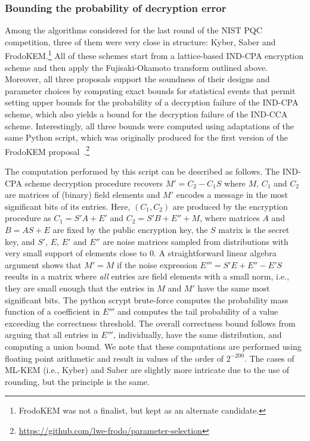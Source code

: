 \documentclass[conference,compsoc]{IEEEtran}
\begin{document}
\subsubsection*{Bounding the probability of decryption error} 
Among the algorithms considered for the last round of the NIST PQC competition, three of them were very close in structure: Kyber, Saber and FrodoKEM.\footnote{FrodoKEM was not a finalist, but kept as an alternate candidate.}
All of these schemes start from a lattice-based IND-CPA encryption scheme and then apply the Fujisaki-Okamoto transform outlined above. Moreover, all three proposals support the soundness of their designs and parameter choices by computing exact bounds for statistical events that permit setting upper bounds for the probability of a decryption failure of the IND-CPA scheme, which also yields a bound for the decryption failure of the IND-CCA scheme.
Interestingly, all three bounds were computed using adaptations of the same Python script, which was originally produced for the first version of the FrodoKEM proposal~\cite{CCS:BCDMNN16}.\footnote{\url{https://github.com/lwe-frodo/parameter-selection}}

The computation performed by this script can be described as follows.
The IND-CPA scheme decryption procedure recovers $M' = C_2 - C_1S$ where $M$, $C_1$ and $C_2$ are matrices of (binary) field elements and $M'$ encodes a message in the most significant bits of its entries. Here, $(C_1,C_2)$ are produced by the encryption procedure as $C_1 = S'A+E'$ and $C_2 = S'B+E'' + M$, where matrices $A$ and $B=AS+E$ are fixed by the public encryption key, the $S$ matrix is the secret key, and $S'$, $E$, $E'$ and $E''$ are noise matrices sampled from distributions with very small support of elements close to $0$. A straightforward linear algebra argument shows that $M'=M$ if the noise expression $E'''=S'E+E''-E'S$ results in a matrix where {\em all} entries are field elements with a small norm, i.e., they are small enough that the entries in $M$ and $M'$ have the same most significant bits.
The python scrypt brute-force computes the probability mass function of a coefficient in $E'''$ and computes the tail probability of a value exceeding the correctness threshold. The overall correctness bound follows from arguing that all entries in $E'''$, individually, have the same distribution, and computing a union bound. We note that these computations are performed using floating point arithmetic and result in values of the order of $2^{-200}$. 
The cases of ML-KEM (i.e., Kyber) and Saber are slightly more intricate due to the use of rounding, but the principle is the same.
\end{document}
